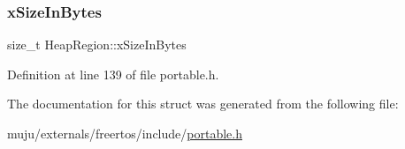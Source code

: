 \subsubsection{\texorpdfstring{x\+Size\+In\+Bytes}{xSizeInBytes}}
{\footnotesize\ttfamily size\+\_\+t Heap\+Region\+::x\+Size\+In\+Bytes}



Definition at line 139 of file portable.\+h.



The documentation for this struct was generated from the following file\+:\begin{DoxyCompactItemize}
\item 
muju/externals/freertos/include/\hyperlink{externals_2freertos_2include_2portable_8h}{portable.\+h}\end{DoxyCompactItemize}

